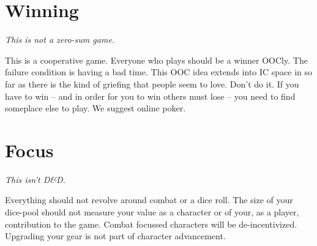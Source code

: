 \section{Winning}
{\em This is not a zero-sum game.}

This is a cooperative game.
Everyone who plays should be a winner OOCly.
The failure condition is having a bad time.
This OOC idea extends into IC space in so far as there is the kind of griefing that people seem to love.
Don't do it. 
If you have to win -- and in order for you to win others must lose -- you need to find someplace else to play.
We suggest online poker.
\section{Focus}
{\em This isn't D\&D.}

Everything should not revolve around combat or a dice roll.
The size of your dice-pool should not measure your value as a character or of your, as a player, contribution to the game.
Combat focussed characters will be de-incentivized.
Upgrading your gear is not part of character advancement.
